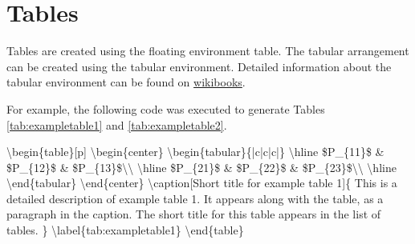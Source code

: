 \documentclass[twoside,openany]{thesis}
\begin{document}
\clearpage

\section{Tables}\label{sec:Tables}

Tables are created using the floating environment {\ttfamily table}.
The tabular arrangement can be created using the {\ttfamily tabular} environment.
Detailed information about the {\ttfamily tabular} environment can be found on \href{https://en.wikibooks.org/wiki/LaTeX/Tables}{wikibooks}.

For example, the following code was executed to generate Tables \ref{tab:exampletable1} and \ref{tab:exampletable2}.

{\ttfamily
    \textbackslash begin\{table\}[p]\linebreak
        \null\quad\textbackslash begin\{center\}\linebreak
            \null\quad\quad\textbackslash begin\{tabular\}\{|c|c|c|\}\linebreak
                \null\quad\quad\textbackslash hline\linebreak
                \null\quad\quad\$P\_\{11\}\$ \& \$P\_\{12\}\$ \& \$P\_\{13\}\$\textbackslash\textbackslash\linebreak
                \null\quad\quad\textbackslash hline\linebreak
                \null\quad\quad\$P\_\{21\}\$ \& \$P\_\{22\}\$ \& \$P\_\{23\}\$\textbackslash\textbackslash\linebreak
                \null\quad\quad\textbackslash hline\linebreak
            \null\quad\quad\textbackslash end\{tabular\}\linebreak
        \null\quad\textbackslash end\{center\}\linebreak
        \null\quad\textbackslash caption[Short title for example table 1]\{\linebreak
            \null\quad\quad This is a detailed description of example table 1.\linebreak
            \null\quad\quad It appears along with the table, as a paragraph in the caption.\linebreak
            \null\quad\quad The short title for this table appears in the list of tables.\linebreak
        \null\quad\}\linebreak
        \null\quad\textbackslash label\{tab:exampletable1\}\linebreak
    \textbackslash end\{table\}
}
\end{document}
